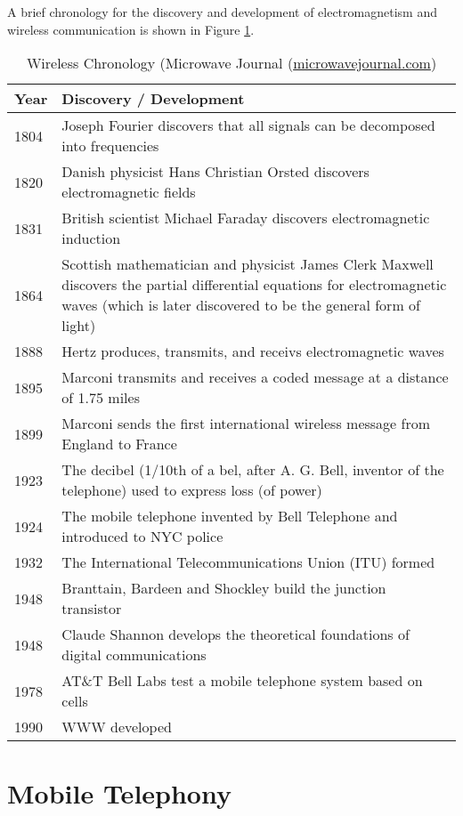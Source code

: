 A brief chronology for the discovery and development of electromagnetism and wireless
communication is shown in Figure \ref{chronology}.
\begin{table}
\begin{tabular}{|l|p{12cm}|}
\hline
\bf Year & \bf Discovery / Development \\
\hline
1804 & Joseph Fourier discovers that all signals can be decomposed into frequencies \\
1820 & Danish physicist Hans Christian Orsted discovers electromagnetic fields \\
1831 & British scientist Michael Faraday discovers electromagnetic induction \\
1864 & Scottish mathematician and physicist James Clerk Maxwell discovers the partial differential equations for electromagnetic waves
	(which is later discovered to be the general form of light)\\
1888 & Hertz produces, transmits, and receivs electromagnetic waves \\
1895 & Marconi transmits and receives a coded message at a distance of 1.75 miles \\
1899 & Marconi sends the first international wireless message from England to France\\
1923 & The decibel (1/10th of a bel, after A. G. Bell, inventor of the telephone) used to express loss (of power) \\
1924 & The mobile telephone invented by Bell Telephone and introduced to NYC police \\
1932 & The International Telecommunications Union (ITU) formed \\
1948 & Branttain, Bardeen and Shockley build the junction transistor\\
1948 & Claude Shannon develops the theoretical foundations of digital communications \\
1978 & AT\&T Bell Labs test a mobile telephone system based on cells\\
1990 & WWW developed\\
\hline
\end{tabular}
	\caption{Wireless Chronology (Microwave Journal (\url{microwavejournal.com})}\label{chronology}
\end{table}

\section{Mobile Telephony}

